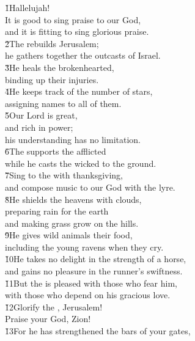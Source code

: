 \begin{poetry}
\poeml \v{1}Hallelujah! \\
\poemll    It is good to sing praise to our God, \\
\poemlll       and it is fitting to sing glorious praise. \\
\poeml \v{2}The  rebuilds Jerusalem; \\
\poemll    he gathers together the outcasts of Israel. \\
\poeml \v{3}He heals the brokenhearted, \\
\poemll    binding up their injuries. \\
\poeml \v{4}He keeps track of the number of stars, \\
\poemll    assigning names to all of them. \\
\poeml \v{5}Our Lord is great, \\
\poemll    and rich in power; \\
\poemlll       his understanding has no limitation. \\
\poeml \v{6}The  supports the afflicted \\
\poemll    while he casts the wicked to the ground. \\
\poeml \v{7}Sing to the  with thanksgiving, \\
\poemll    and compose music to our God with the lyre. \\
\poeml \v{8}He shields the heavens with clouds, \\
\poemll    preparing rain for the earth \\
\poemlll       and making grass grow on the hills. \\
\poeml \v{9}He gives wild animals their food, \\
\poemll    including the young ravens when they cry. \\
\poeml \v{10}He takes no delight in the strength of a horse, \\
\poemll    and gains no pleasure in the runner's swiftness. \\
\poeml \v{11}But the  is pleased with those who fear him, \\
\poemll    with those who depend on his gracious love. \\
\poeml \v{12}Glorify the , Jerusalem! \\
\poemll    Praise your God, Zion! \\
\poeml \v{13}For he has strengthened the bars of your gates, \\

\end{poetry}

